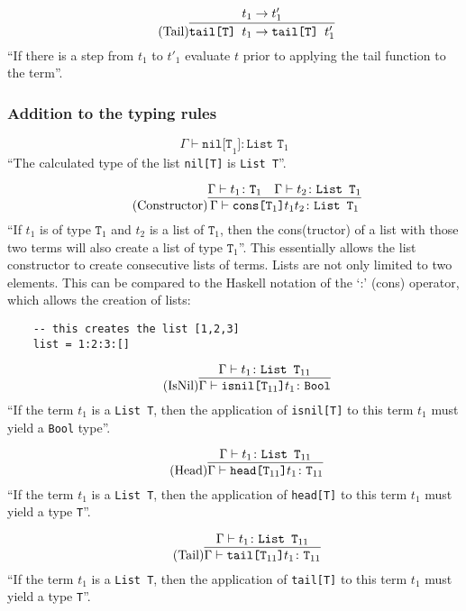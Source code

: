 \begin{equation*}
    \tag{Tail}
    \infer{
        \texttt{tail[T] } t_1 \rightarrow \texttt{tail[T] } t'_1
    }{
        t_1 \rightarrow t'_1
    }
\end{equation*}
``If there is a step from $t_1$ to $t'_1$ evaluate $t$ prior to applying
the tail function to the term''.

\subsubsection{Addition to the typing rules \cite{pierce2002ProgLang}}
\begin{equation*}
    \tag{Nil}
    \Gamma \vdash \texttt{nil[T}_1\texttt{]} \colon \texttt{List T}_1
\end{equation*}
``The calculated type of the list \texttt{nil[T]} is \texttt{List T}''.

\begin{equation*}
    \tag{Constructor}
    \infer{
    \Gamma \vdash \texttt{cons[T}_1 \texttt{]} t_1 t_2 \colon \texttt{List T}_1
    }{
    \Gamma \vdash t_1 \colon \texttt{T}_1 & \Gamma \vdash t_2 \colon \texttt{List T}_1
    }
\end{equation*}
``If $t_1$ is of type $\texttt{T}_1$ and $t_2$ is a list of $\texttt{T}_1$,
then the cons(tructor) of a list with those two terms will also create
a list of type $\texttt{T}_1$''. This essentially allows the list constructor
to create consecutive lists of terms. Lists are not only limited to two elements.
This can be compared to the Haskell notation of the `:' (cons) operator, which
allows the creation of lists:

\begin{verbatim}
    -- this creates the list [1,2,3]
    list = 1:2:3:[]
\end{verbatim}

\begin{equation*}
    \tag{IsNil}
    \infer{
    \Gamma \vdash \texttt{isnil[T}_{11} \texttt{]} t_1 \colon \texttt{Bool}
    }{
    \Gamma \vdash t_1 \colon \texttt{List T}_{11}
    }
\end{equation*}
``If the term $t_1$ is a \texttt{List T}, then the application of
\texttt{isnil[T]} to this term $t_1$ must yield a \texttt{Bool} type''.

\begin{equation*}
    \tag{Head}
    \infer{
    \Gamma \vdash \texttt{head[T}_{11} \texttt{]} t_1 \colon \texttt{T}_{11}
    }{
    \Gamma \vdash t_1 \colon \texttt{List T}_{11}
    }
\end{equation*}
``If the term $t_1$ is a \texttt{List T}, then the application of
\texttt{head[T]} to this term $t_1$ must yield a type \texttt{T}''.

\begin{equation*}
    \tag{Tail}
    \infer{
    \Gamma \vdash \texttt{tail[T}_{11} \texttt{]} t_1 \colon \texttt{T}_{11}
    }{
    \Gamma \vdash t_1 \colon \texttt{List T}_{11}
    }
\end{equation*}
``If the term $t_1$ is a \texttt{List T}, then the application of
\texttt{tail[T]} to this term $t_1$ must yield a type \texttt{T}''.
